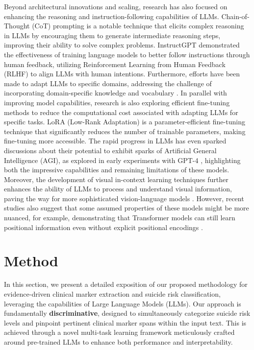 Beyond architectural innovations and scaling, research has also focused on enhancing the reasoning and instruction-following capabilities of LLMs. Chain-of-Thought (CoT) prompting is a notable technique that elicits complex reasoning in LLMs by encouraging them to generate intermediate reasoning steps, improving their ability to solve complex problems. InstructGPT demonstrated the effectiveness of training language models to better follow instructions through human feedback, utilizing Reinforcement Learning from Human Feedback (RLHF) to align LLMs with human intentions. Furthermore, efforts have been made to adapt LLMs to specific domains, addressing the challenge of incorporating domain-specific knowledge and vocabulary \cite{AdaptingLM}. In parallel with improving model capabilities, research is also exploring efficient fine-tuning methods to reduce the computational cost associated with adapting LLMs for specific tasks. LoRA (Low-Rank Adaptation) \cite{Hu2021} is a parameter-efficient fine-tuning technique that significantly reduces the number of trainable parameters, making fine-tuning more accessible. The rapid progress in LLMs has even sparked discussions about their potential to exhibit sparks of Artificial General Intelligence (AGI), as explored in early experiments with GPT-4 \cite{Bubeck2023}, highlighting both the impressive capabilities and remaining limitations of these models.  Moreover, the development of visual in-context learning techniques further enhances the ability of LLMs to process and understand visual information, paving the way for more sophisticated vision-language models \cite{zhou2024visual}. However, recent studies also suggest that some assumed properties of these models might be more nuanced, for example, demonstrating that Transformer models can still learn positional information even without explicit positional encodings \cite{TransformerWithoutPE}.


\section{Method}

In this section, we present a detailed exposition of our proposed methodology for evidence-driven clinical marker extraction and suicide risk classification, leveraging the capabilities of Large Language Models (LLMs). Our approach is fundamentally \textbf{discriminative}, designed to simultaneously categorize suicide risk levels and pinpoint pertinent clinical marker spans within the input text. This is achieved through a novel multi-task learning framework meticulously crafted around pre-trained LLMs to enhance both performance and interpretability.

